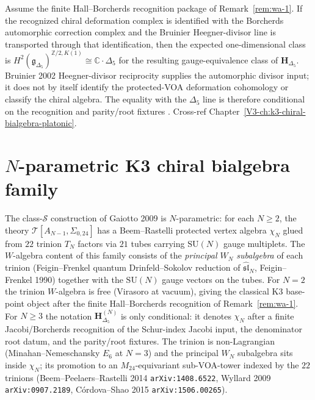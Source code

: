 \begin{remark}
\label{rem:wa-2}
Assume the finite Hall--Borcherds recognition package of
Remark~\ref{rem:wa-1}. If the recognized chiral deformation complex is
identified with the Borcherds automorphic correction complex and the
Bruinier Heegner-divisor line is transported through that identification,
then the expected one-dimensional class is
$H^2(\mathfrak g_{\Delta_5})^{\mathbb Z/2, K(1)} \cong \mathbb C\cdot\Delta_5$
for the resulting gauge-equivalence class of $\mathbf H_{\Delta_5}$.
Bruinier 2002 Heegner-divisor reciprocity supplies the automorphic
divisor input; it does not by itself identify the protected-VOA
deformation cohomology or classify the chiral algebra. The equality
with the $\Delta_5$ line is therefore conditional on the recognition
and parity/root fixtures
\cite{Bruinier2002,EtingofKazhdan2007PartV}. Cross-ref
Chapter~\ref{V3-ch:k3-chiral-bialgebra-platonic}.
\end{remark}

\section{$N$-parametric K3 chiral bialgebra family}
\label{sec:wa-supplement-ii}

\begin{remark}
\label{rem:wa-N-extension}
The class-$\mathcal S$ construction of Gaiotto 2009 is
$N$-parametric: for each $N \ge 2$, the theory
$\mathcal T[A_{N-1}, \Sigma_{0,24}]$ has a Beem--Rastelli protected
vertex algebra $\chi_N$ glued from $22$
trinion $T_N$ factors via $21$ tubes carrying $\mathrm{SU}(N)$
gauge multiplets. The $W$-algebra content of this family consists
of the \emph{principal $W_N$ subalgebra} of each trinion (Feigin--Frenkel
quantum Drinfeld--Sokolov reduction of $\widehat{\mathfrak{sl}}_N$,
Feigin--Frenkel 1990) together with the $\mathrm{SU}(N)$ gauge
vectors on the tubes. For $N = 2$ the trinion $W$-algebra is free
(Virasoro at vacuum), giving the classical K3 base-point object after
the finite Hall--Borcherds recognition of Remark~\ref{rem:wa-1}. For
$N \ge 3$ the notation $\mathbf H^{(N)}_{\Delta_5}$ is only conditional:
it denotes $\chi_N$ after a finite Jacobi/Borcherds recognition of the
Schur-index Jacobi input, the denominator root datum, and the
parity/root fixtures. The
trinion is non-Lagrangian (Minahan--Nemeschansky $E_6$ at $N = 3$)
and the principal $W_N$ subalgebra sits inside
$\chi_N$; its promotion to an $M_{24}$-equivariant
sub-VOA-tower indexed by the $22$ trinions
(Beem--Peelaers--Rastelli 2014 \texttt{arXiv:1408.6522},
Wyllard 2009 \texttt{arXiv:0907.2189}, C\'ordova--Shao 2015
\texttt{arXiv:1506.00265}).
\end{remark}

